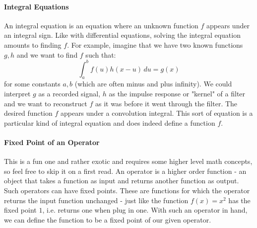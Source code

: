 
\paragraph{Integral Equations}
An integral equation is an equation where an unknown function $f$ appears under an integral sign. Like with differential equations, solving the integral equation amounts to finding $f$. For example, imagine that we have two known functions $g, h$ and we want to find $f$ such that:
\begin{equation}
 \int_a^b f(u) h(x-u) \, du = g(x)
\end{equation}
for some constants $a,b$ (which are often minus and plus infinity). We could interpret $g$ as a recorded signal, $h$ as the impulse response or "kernel" of a filter and we want to reconstruct $f$ as it was before it went through the filter. The desired function $f$ appears under a convolution integral. This sort of equation is a particular kind of integral equation and does indeed define a function $f$.








\paragraph{Fixed Point of an Operator}
This is a fun one and rather exotic and requires some higher level math concepts, so feel free to skip it on a first read. An operator is a higher order function - an object that takes a function as input and returns another function as output. Such operators can have fixed points. These are functions for which the operator returns the input function unchanged - just like the function $f(x) = x^2$ has the fixed point $1$, i.e. returns one when plug in one. With such an operator in hand, we can define the function to be a fixed point of our given operator. 

